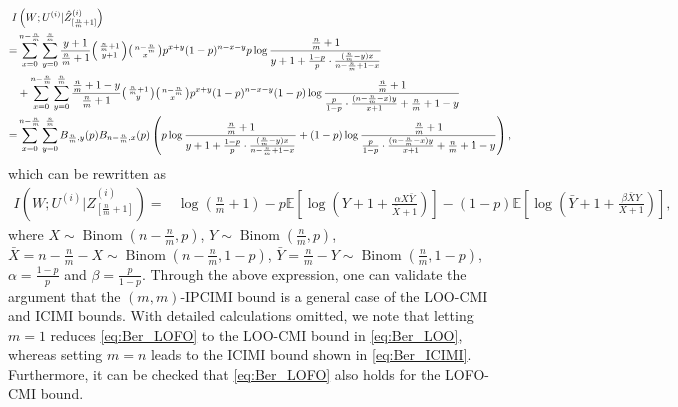 \documentclass[onecolumn,romanappendices,10pt]{IEEEtran}
\newcommand{\EE}{{\mathbb{E}}}
\DeclareMathOperator{\Binomial}{Binom}
\begin{document}
	\begin{equation}
		\begin{aligned}
			I&\left( W; U^{(i)} | \hat{Z}_{[\frac{n}{m}+1]}^{(i)} \right)\\
			=& \sum_{x=0}^{n - \frac{n}{m}} \sum_{y=0}^{\frac{n}{m}} \frac{y + 1}{\frac{n}{m} + 1} \begin{psmallmatrix} \frac{n}{m} + 1 \\ y + 1 \end{psmallmatrix} \begin{psmallmatrix} n - \frac{n}{m} \\ x \end{psmallmatrix} p^{x+y} (1 - p)^{n - x - y} p \log \frac{\frac{n}{m} + 1}{y + 1 + \frac{1 - p}{p} \cdot \frac{(\frac{n}{m} - y) x}{n - \frac{n}{m} + 1 - x}} \\
			& + \sum_{x=0}^{n - \frac{n}{m}} \sum_{y=0}^{\frac{n}{m}} \frac{\frac{n}{m} + 1 - y}{\frac{n}{m} + 1} \begin{psmallmatrix} \frac{n}{m} + 1 \\ y \end{psmallmatrix} \begin{psmallmatrix} n - \frac{n}{m} \\ x \end{psmallmatrix} p^{x+y} (1 - p)^{n - x - y} (1 - p) \log \frac{\frac{n}{m} + 1}{\frac{p}{1 - p} \cdot \frac{(n - \frac{n}{m} - x) y}{x + 1} + \frac{n}{m} + 1 - y} \\
			=& \sum_{x=0}^{n - \frac{n}{m}} \sum_{y=0}^{\frac{n}{m}} B_{\frac{n}{m}, y}(p) B_{n - \frac{n}{m}, x}(p) \left( p \log \frac{\frac{n}{m} + 1}{y + 1 + \frac{1 - p}{p} \cdot \frac{(\frac{n}{m} - y) x}{n - \frac{n}{m} + 1 - x}} + (1 - p) \log \frac{\frac{n}{m} + 1}{\frac{p}{1 - p} \cdot \frac{(n - \frac{n}{m} - x) y}{x + 1} + \frac{n}{m} + 1 - y} \right),
		\end{aligned}
	\end{equation}
	which can be rewritten as
	\begin{equation}
		\begin{aligned}
			I\left( W; U^{(i)} | \hat{Z}_{[\frac{n}{m}+1]}^{(i)} \right) =& \log \left( \frac{n}{m} + 1 \right) - p \EE \left[ \log \left( Y + 1 + \frac{\alpha X \bar{Y}}{\bar{X} + 1} \right) \right]- (1 - p) \EE \left[ \log \left( \bar{Y} + 1 + \frac{\beta \bar{X} Y}{X + 1} \right) \right],
		\end{aligned}
		\label{eq:Ber_LOFO}
	\end{equation}
	where $X \sim \Binomial\left( n - \frac{n}{m}, p \right)$, $Y \sim \Binomial\left( \frac{n}{m}, p \right)$, $\bar{X} = n - \frac{n}{m} - X \sim \Binomial\left( n - \frac{n}{m}, 1 - p \right)$, $\bar{Y} = \frac{n}{m} - Y \sim \Binomial\left( \frac{n}{m}, 1 - p \right)$, $\alpha = \frac{1 - p}{p}$ and $\beta = \frac{p}{1 - p}$. Through the above expression, one can validate the argument that the $(m, m)$-IPCIMI bound is a general case of the LOO-CMI and ICIMI bounds. With detailed calculations omitted, we note that letting $m = 1$ reduces \eqref{eq:Ber_LOFO} to the LOO-CMI bound in \eqref{eq:Ber_LOO}, whereas setting $m = n$ leads to the ICIMI bound shown in \eqref{eq:Ber_ICIMI}. Furthermore, it can be checked that \eqref{eq:Ber_LOFO} also holds for the LOFO-CMI bound. 
	
\end{document}
